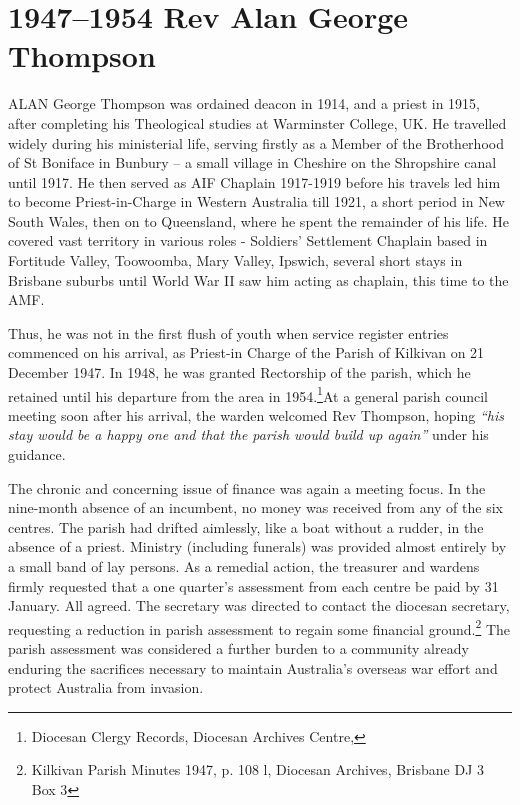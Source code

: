\balance


\printendnotes[custom]
\setcounter{endnote}{0}
\chapter{1947--1954 Rev Alan George Thompson}
\nobalance


\lettrine[lines=3]{A}{LAN}
 George Thompson was ordained deacon in 1914, and a priest in 1915, after completing his Theological studies at Warminster College, UK. He travelled widely during his ministerial life, serving firstly as a Member of the Brotherhood of St Boniface in Bunbury -- a small village in Cheshire on the Shropshire canal until 1917. He then served as AIF Chaplain 1917-1919 before his travels led him to become Priest-in-Charge in Western Australia till 1921, a short period in New South Wales, then on to Queensland, where he spent the remainder of his life. He covered vast territory in various roles - Soldiers' Settlement Chaplain based in Fortitude Valley, Toowoomba, Mary Valley, Ipswich, several short stays in Brisbane suburbs until World War II saw him acting as chaplain, this time to the AMF.

Thus, he was not in the first flush of youth when service register entries commenced on his arrival, as Priest-in Charge of the Parish of Kilkivan on 21 December 1947. In 1948, he was granted Rectorship of the parish, which he retained until his departure from the area in 1954.\footnote{Diocesan Clergy Records, Diocesan Archives Centre,}At a general parish council meeting soon after his arrival, the warden welcomed Rev Thompson, hoping \emph{``his stay would be a happy one and that the parish would build up again''} under his guidance.


The chronic and concerning issue of finance was again a meeting focus. In the nine-month absence of an incumbent, no money was received from any of the six centres. The parish had drifted aimlessly, like a boat without a rudder, in the absence of a priest. Ministry (including funerals) was provided almost entirely by a small band of lay persons. As a remedial action, the treasurer and wardens firmly requested that a one quarter's assessment from each centre be paid by 31 January. All agreed. The secretary was directed to contact the diocesan secretary, requesting a reduction in parish assessment to regain some financial ground.\footnote{Kilkivan Parish Minutes 1947, p. 108 l, Diocesan Archives, Brisbane DJ 3 Box 3} The parish assessment was considered a further burden to a community already enduring the sacrifices necessary to maintain Australia's overseas war effort and protect Australia from invasion.


